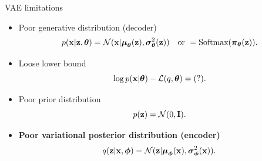 \begin{frame}{VAE limitations}
	\begin{itemize}
		\item Poor generative distribution (decoder)
		\[
			p(\mathbf{x} | \mathbf{z}, \boldsymbol{\theta}) = \mathcal{N}(\mathbf{x}| \boldsymbol{\mu}_{\boldsymbol{\theta}}(\mathbf{z}), \boldsymbol{\sigma}^2_{\boldsymbol{\theta}}(\mathbf{z})) \quad \text{or } = \text{Softmax}(\boldsymbol{\pi}_{\boldsymbol{\theta}}(\mathbf{z})).
		\]
		\item Loose lower bound
		\[
			\log p(\mathbf{x} | \boldsymbol{\theta}) - \mathcal{L}(q, \boldsymbol{\theta}) = (?).
		\]
		\item Poor prior distribution
		\[
			p(\mathbf{z}) = \mathcal{N}(0, \mathbf{I}).
		\]
		\item \textbf{Poor variational posterior distribution (encoder)}
		\[
			q(\mathbf{z} | \mathbf{x}, \boldsymbol{\phi}) = \mathcal{N}(\mathbf{z}| \boldsymbol{\mu}_{\boldsymbol{\phi}}(\mathbf{x}), \boldsymbol{\sigma}^2_{\boldsymbol{\phi}}(\mathbf{x})).
		\]
	\end{itemize}
\end{frame}
